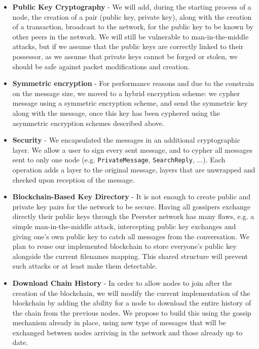\documentclass[11pt, a4paper]{article}
\begin{document}
        \begin{itemize}

        \item \textbf{Public Key Cryptography} -
        We will add, during the starting process of a node, the creation of a pair (public key, private key), along with the creation of a transaction, broadcast to the network, for the public key to be known by other peers in the network.
        We will still be vulnerable to man-in-the-middle attacks, but if we assume that the public keys are correctly linked to their possessor, as we assume that private keys cannot be forged or stolen, we should be safe against packet modifications and creation.

        \item \textbf{Symmetric encryption} -
            For performance reasons and due to the constrain on the message size, we moved to a hybrid encryption scheme: we cypher message using a symmetric encryption scheme, and send the symmetric key along with the message, once this key has been cyphered using the asymmetric encryption schemes described above.

        \item \textbf{Security} - We encapsulated the messages in an additional cryptographic layer. We allow a user to sign every sent message, and to cypher all messages sent to only one node (e.g. \texttt{PrivateMessage}, \texttt{SearchReply}, ...). Each operation adds a layer to the original message, layers that are unwrapped and checked upon reception of the message.

        \item \textbf{Blockchain-Based Key Directory} -
        It is not enough to create public and private key pairs for the network to be secure.
        Having all gossipers exchange directly their public keys through the Peerster network has many flaws, e.g. a simple man-in-the-middle attack, intercepting public key exchanges and giving one's own public key to catch all messages from the conversation.
        We plan to reuse our implemented blockchain to store everyone's public key alongside the current filenames mapping. This shared structure will prevent such attacks or at least make them detectable.

        \item \textbf{Download Chain History} -
        In order to allow nodes to join after the creation of the blockchain, we will modify the current implementation of the blockchain by adding the ability for a node to download the entire history of the chain from the previous nodes.
        We propose to build this using the gossip mechanism already in place, using new type of messages that will be exchanged between nodes arriving in the network and those already up to date.


\end{itemize}
\end{document}
